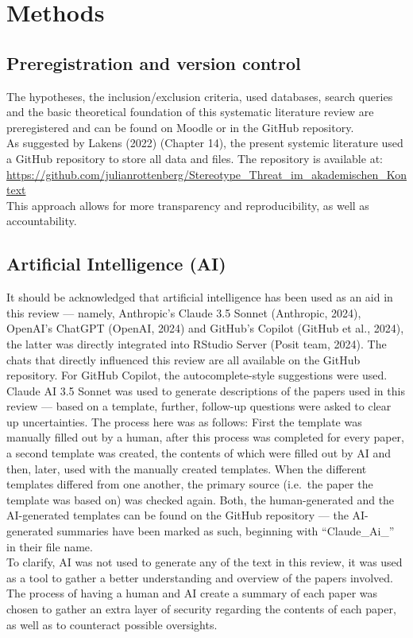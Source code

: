 \documentclass[
  stu, a4paper, 12pt,mask,floatsintext]{apa7}
\begin{document}
\section{Methods}\label{methods}

\subsection{Preregistration and version control}\label{preregistration-and-version-control}

The hypotheses, the inclusion/exclusion criteria, used databases, search queries and the basic theoretical foundation of this systematic literature review are preregistered and can be found on Moodle or in the GitHub repository.\\
As suggested by Lakens (2022) (Chapter 14), the present systemic literature used a GitHub repository to store all data and files. The repository is available at: \url{https://github.com/julianrottenberg/Stereotype_Threat_im_akademischen_Kontext}\\
This approach allows for more transparency and reproducibility, as well as accountability.

\subsection{Artificial Intelligence (AI)}\label{artificial-intelligence-ai}

It should be acknowledged that artificial intelligence has been used as an aid in this review --- namely, Anthropic's Claude 3.5 Sonnet (Anthropic, 2024), OpenAI's ChatGPT (OpenAI, 2024) and GitHub's Copilot (GitHub et al., 2024), the latter was directly integrated into RStudio Server (Posit team, 2024). The chats that directly influenced this review are all available on the GitHub repository.
For GitHub Copilot, the autocomplete-style suggestions were used.\\
Claude AI 3.5 Sonnet was used to generate descriptions of the papers used in this review --- based on a template, further, follow-up questions were asked to clear up uncertainties.
The process here was as follows: First the template was manually filled out by a human, after this process was completed for every paper, a second template was created, the contents of which were filled out by AI and then, later, used with the manually created templates. When the different templates differed from one another, the primary source (i.e.~the paper the template was based on) was checked again. Both, the human-generated and the AI-generated templates can be found on the GitHub repository --- the AI-generated summaries have been marked as such, beginning with ``Claude\_Ai\_'' in their file name.\\
To clarify, AI was not used to generate any of the text in this review, it was used as a tool to gather a better understanding and overview of the papers involved. The process of having a human and AI create a summary of each paper was chosen to gather an extra layer of security regarding the contents of each paper, as well as to counteract possible oversights.
\end{document}
